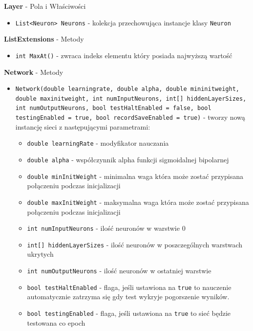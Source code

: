 \documentclass[12pt,a4paper]{article}
\begin{document}
    
    \textbf{Layer} - Pola i Właściwości
    \begin{itemize}
        \item \lstinline{List<Neuron> Neurons} - kolekcja przechowująca instancje klasy \lstinline{Neuron}
    \end{itemize}
    
    
    \textbf{ListExtensions} - Metody
    \begin{itemize}
        \item \lstinline{int MaxAt()} - zwraca indeks elementu który posiada najwyższą wartość
    \end{itemize}
    
    \textbf{Network} - Metody
    \begin{itemize}
        \item \lstinline{Network(double learningrate, double alpha, double mininitweight, double maxinitweight, int numInputNeurons, int[] hiddenLayerSizes, int numOutputNeurons, bool testHaltEnabled = false, bool testingEnabled = true, bool recordSaveEnabled = true)} - tworzy nową instancję sieci z następującymi parametrami:
        \begin{itemize}
            \item \lstinline{double learningRate} - modyfikator nauczania %
            \item \lstinline{double alpha} - współczynnik alpha funkcji sigmoidalnej bipolarnej
            \item \lstinline{double minInitWeight} - minimalna waga która może zostać przypisana połączeniu podczas inicjalizacji
            \item \lstinline{double maxInitWeight} - maksymalna waga która może zostać przypisana połączeniu podczas inicjalizacji
            \item \lstinline{int numInputNeurons} - ilość neuronów w warstwie 0
            \item \lstinline{int[] hiddenLayerSizes} - ilość neuronów w poszczególnych warstwach ukrytych
            \item \lstinline{int numOutputNeurons} - ilość neuronów w ostatniej warstwie
            \item \lstinline{bool testHaltEnabled} - flaga, jeśli ustawiona na \lstinline{true} to nauczenie automatycznie zatrzyma się gdy test wykryje pogorszenie wyników.
            \item \lstinline{bool testingEnabled} - flaga, jeśli ustawiona na \lstinline{true} to sieć będzie testowana co epoch

\end{itemize}
\end{itemize}
\end{document}
